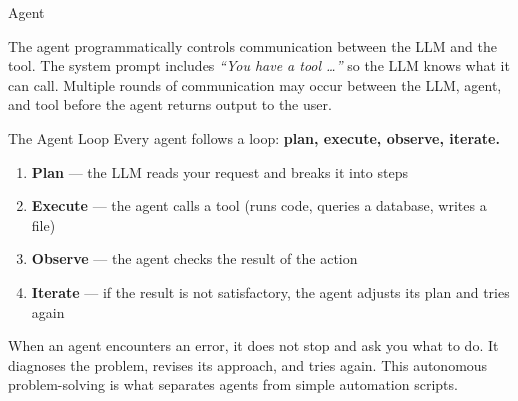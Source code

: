 \documentclass[aspectratio=169]{beamer}
\begin{document}
\begin{frame}{Agent}
\begin{center}
\end{center}
\vspace{0.2cm}
The agent programmatically controls communication between the LLM and the tool.  The system prompt includes \textit{``You have a tool \ldots''} so the LLM knows what it can call.  Multiple rounds of communication may occur between the LLM, agent, and tool before the agent returns output to the user.
\end{frame}

\begin{frame}{The Agent Loop}
Every agent follows a loop: \textbf{plan, execute, observe, iterate.}
\vspace{0.3cm}
\begin{enumerate}
  \item \textbf{Plan} --- the LLM reads your request and breaks it into steps
  \item \textbf{Execute} --- the agent calls a tool (runs code, queries a database, writes a file)
  \item \textbf{Observe} --- the agent checks the result of the action
  \item \textbf{Iterate} --- if the result is not satisfactory, the agent adjusts its plan and tries again
\end{enumerate}
\vspace{0.3cm}
When an agent encounters an error, it does not stop and ask you what to do.  It diagnoses the problem, revises its approach, and tries again.  This \alert{autonomous problem-solving} is what separates agents from simple automation scripts.
\end{frame}
\end{document}
